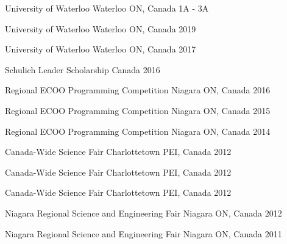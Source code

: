 
\begin{cvhonors}

   {University of Waterloo} {Waterloo ON, Canada}
  {1A - 3A}

   {University of Waterloo}
  {Waterloo ON, Canada} {2019}

   {University of Waterloo}
  {Waterloo ON, Canada} {2017}

   {Schulich Leader Scholarship} {Canada} {2016}

   {Regional ECOO Programming Competition} {Niagara ON,
    Canada} {2016}

   {Regional ECOO Programming Competition} {Niagara ON,
    Canada} {2015}

   {Regional ECOO Programming Competition} {Niagara ON,
    Canada} {2014}

   {Canada-Wide Science Fair} {Charlottetown PEI, Canada}
  {2012}

   {Canada-Wide Science Fair} {Charlottetown
    PEI, Canada} {2012}

   {Canada-Wide Science Fair}
  {Charlottetown PEI, Canada} {2012}

   {Niagara Regional Science and Engineering Fair} {Niagara
    ON, Canada} {2012}

   {Niagara Regional Science and Engineering Fair} {Niagara
    ON, Canada} {2011}

\end{cvhonors}
